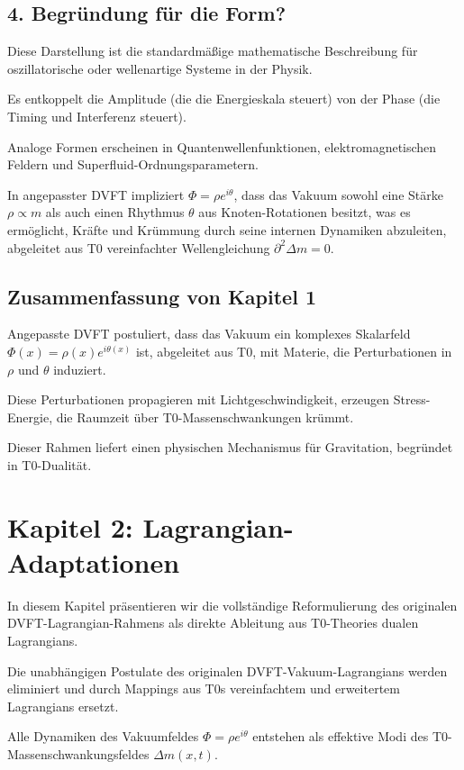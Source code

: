\documentclass[12pt,a4paper]{article}
\begin{document}
	\subsection{4. Begründung für die Form?}
	
	Diese Darstellung ist die standardmäßige mathematische Beschreibung für oszillatorische oder wellenartige Systeme in der Physik.
	
	Es entkoppelt die Amplitude (die die Energieskala steuert) von der Phase (die Timing und Interferenz steuert).
	
	Analoge Formen erscheinen in Quantenwellenfunktionen, elektromagnetischen Feldern und Superfluid-Ordnungsparametern.
	
	In angepasster DVFT impliziert $\Phi = \rho e^{i\theta}$, dass das Vakuum sowohl eine Stärke $\rho \propto m$ als auch einen Rhythmus $\theta$ aus Knoten-Rotationen besitzt, was es ermöglicht, Kräfte und Krümmung durch seine internen Dynamiken abzuleiten, abgeleitet aus T0 vereinfachter Wellengleichung $\partial^2 \Delta m = 0$.
	
	\subsection{Zusammenfassung von Kapitel 1}
	
	Angepasste DVFT postuliert, dass das Vakuum ein komplexes Skalarfeld $\Phi(x) = \rho(x) e^{i\theta(x)}$ ist, abgeleitet aus T0, mit Materie, die Perturbationen in $\rho$ und $\theta$ induziert.
	
	Diese Perturbationen propagieren mit Lichtgeschwindigkeit, erzeugen Stress-Energie, die Raumzeit über T0-Massenschwankungen krümmt.
	
	Dieser Rahmen liefert einen physischen Mechanismus für Gravitation, begründet in T0-Dualität.
	
	\section{Kapitel 2: Lagrangian-Adaptationen}
	
	In diesem Kapitel präsentieren wir die vollständige Reformulierung des originalen DVFT-Lagrangian-Rahmens als direkte Ableitung aus T0-Theories dualen Lagrangians.
	
	Die unabhängigen Postulate des originalen DVFT-Vakuum-Lagrangians werden eliminiert und durch Mappings aus T0s vereinfachtem und erweitertem Lagrangians ersetzt.
	
	Alle Dynamiken des Vakuumfeldes $\Phi = \rho e^{i\theta}$ entstehen als effektive Modi des T0-Massenschwankungsfeldes $\Delta m(x,t)$.
	
\end{document}
